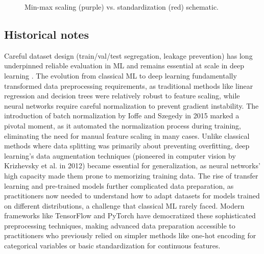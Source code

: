 \begin{figure}[ht]
  \centering
  \caption{Min-max scaling (purple) vs. standardization (red) schematic.}
  \label{fig:scaling}
\end{figure}

\subsection{Historical notes}

Careful dataset design (train/val/test segregation, leakage prevention) has long underpinned reliable evaluation in ML and remains essential at scale in deep learning \textcite{Bishop2006,GoodfellowEtAl2016}. The evolution from classical ML to deep learning fundamentally transformed data preprocessing requirements, as traditional methods like linear regression and decision trees were relatively robust to feature scaling, while neural networks require careful normalization to prevent gradient instability. The introduction of batch normalization by Ioffe and Szegedy in 2015 marked a pivotal moment, as it automated the normalization process during training, eliminating the need for manual feature scaling in many cases. Unlike classical methods where data splitting was primarily about preventing overfitting, deep learning's data augmentation techniques (pioneered in computer vision by Krizhevsky et al. in 2012) became essential for generalization, as neural networks' high capacity made them prone to memorizing training data. The rise of transfer learning and pre-trained models further complicated data preparation, as practitioners now needed to understand how to adapt datasets for models trained on different distributions, a challenge that classical ML rarely faced. Modern frameworks like TensorFlow and PyTorch have democratized these sophisticated preprocessing techniques, making advanced data preparation accessible to practitioners who previously relied on simpler methods like one-hot encoding for categorical variables or basic standardization for continuous features.

